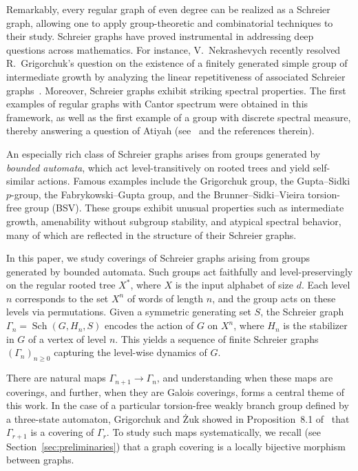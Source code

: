 \documentclass{article}
\newcommand{\G}{\Gamma}
\begin{document}
Remarkably, every regular graph of even degree can be realized as a Schreier graph, allowing one to apply group-theoretic and combinatorial techniques to their study. Schreier graphs have proved instrumental in addressing deep questions across mathematics. For instance, V.~Nekrashevych recently resolved R.~Grigorchuk's question on the existence of a finitely generated simple group of intermediate growth by analyzing the linear repetitiveness of associated Schreier graphs~\cite{nekrashevych2018palindromic}. Moreover, Schreier graphs exhibit striking spectral properties. The first examples of regular graphs with Cantor spectrum were obtained in this framework, as well as the first example of a group with discrete spectral measure, thereby answering a question of Atiyah (see~\cite{bartholdi2003fractal} and the references therein).

An especially rich class of Schreier graphs arises from groups generated by \emph{bounded automata}, which act level-transitively on rooted trees and yield self-similar actions. Famous examples include the Grigorchuk group, the Gupta--Sidki $p$-group, the Fabrykowski--Gupta group, and the Brunner--Sidki--Vieira torsion-free group (BSV). These groups exhibit unusual properties such as intermediate growth, amenability without subgroup stability, and atypical spectral behavior, many of which are reflected in the structure of their Schreier graphs.

In this paper, we study coverings of Schreier graphs arising from groups generated by bounded automata. Such groups act faithfully and level-preservingly on the regular rooted tree $X^*$, where $X$ is the input alphabet of size $d$. Each level $n$ corresponds to the set $X^n$ of words of length $n$, and the group acts on these levels via permutations. Given a symmetric generating set $S$, the Schreier graph $\G_n = \operatorname{Sch}(G, H_n, S)$ encodes the action of $G$ on $X^n$, where $H_n$ is the stabilizer in $G$ of a vertex of level $n$. This yields a sequence of finite Schreier graphs $(\G_n)_{n \geq 0}$ capturing the level-wise dynamics of $G$.

There are natural maps $\G_{n+1} \to \G_n$, and understanding when these maps are coverings, and further, when they are Galois coverings, forms a central theme of this work. In the case of a particular torsion-free weakly branch group defined by a three-state automaton, Grigorchuk and Żuk showed in Proposition~8.1 of~\cite{grigorchuk2002torsion} that $\G_{r+1}$ is a covering of $\G_r$. To study such maps systematically, we recall (see Section~\ref{sec:preliminaries}) that a graph covering is a locally bijective morphism between graphs.
\end{document}
